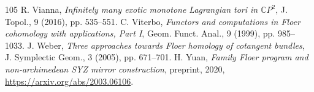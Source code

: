 \documentclass[UTF8,a4paper,11pt,fontset=windows]{ctexart}
\theoremstyle{cnthm}
\numberwithin{equation}{section}
\begin{document}
\begin{thebibliography}{105}
 R. Vianna, \emph{Infinitely many exotic monotone Lagrangian tori in $\mathbb{C}P^2$}, J. Topol., 9 (2016), pp. 535--551.
 C. Viterbo, \emph{Functors and computations in Floer cohomology with applications, Part I}, Geom. Funct. Anal., 9 (1999), pp. 985--1033.
 J. Weber, \emph{Three approaches towards Floer homology of cotangent bundles}, J. Symplectic Geom., 3 (2005), pp. 671--701.
 H. Yuan, \emph{Family Floer program and non-archimedean SYZ mirror construction}, preprint, 2020, \url{https://arxiv.org/abs/2003.06106}.
\end{thebibliography}
\end{document}
